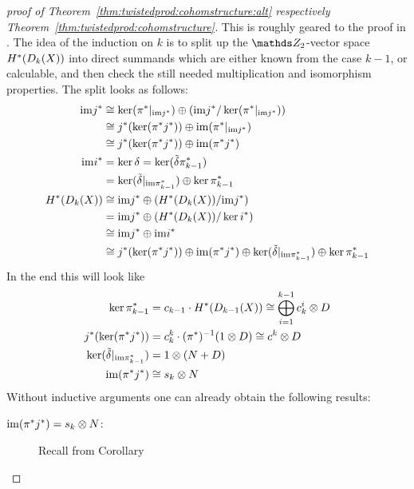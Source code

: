 \begin{proof}[proof of
  Theorem~\ref{thm:twistedprod:cohomstructure:alt}
  respectively Theorem~\ref{thm:twistedprod:cohomstructure}]
  This is roughly geared to the proof in \cite[Theorem~7.1]{brown}.
  The idea of the induction on $k$ is to split up the $\Zmod2$-vector
  space $H^*(D_{k}({X}))$ into direct summands which are either known
  from the case $k-1$, or calculable,
  and then check the still needed multiplication and isomorphism
  properties.
  The split looks as follows:
  \begin{align*}
    \mathrm{im}{j}^*
    &\cong \ker({\pi}^*|_{\mathrm{im}{j}^*})
      \oplus \left(\mathrm{im}{j}^*/\ker({\pi}^*|_{\mathrm{im}{j}^*})\right) \\
    &\cong {j}^*(\ker({\pi}^*{j}^*))
      \oplus \mathrm{im}({\pi}^*|_{\mathrm{im}{j}^*}) \\
    &\cong {j}^*(\ker({\pi}^*{j}^*))
      \oplus \mathrm{im}({\pi}^*{j}^*) \\
    \mathrm{im}{i}^*
    &= \ker\delta = \ker(\tilde\delta{\pi}^*_{k-1})\\
    &= \ker(\tilde\delta|_{\mathrm{im}{\pi}^*_{k-1}})
      \oplus \ker{\pi}^*_{k-1} \\
    H^*(D_{k}({X}))
    &\cong \mathrm{im}{j}^*
      \oplus \left( H^*(D_{k}({X}))/\mathrm{im}{j}^* \right)\\
    &= \mathrm{im}{j}^*
      \oplus \left( H^*(D_{k}({X}))/\ker{i}^* \right)\\
    &\cong \mathrm{im}{j}^* \oplus \mathrm{im}{i}^*\\
    &\cong {j}^*(\ker({\pi}^*{j}^*))
      \oplus \mathrm{im}({\pi}^*{j}^*)
      \oplus \ker(\tilde\delta|_{\mathrm{im}{\pi}^*_{k-1}})
      \oplus \ker{\pi}^*_{k-1}
  \end{align*}
  In the end this will look like
  \begin{align*}
    \ker{\pi}^*_{k-1} &= c_{k-1}\cdot H^*(D_{k-1}({X}))
                       \cong \bigoplus_{i=1}^{k-1} c_k^i\otimes D \\
    {j}^*(\ker({\pi}^*{j}^*))
    &= c_k^k\cdot({\pi}^*)^{-1}(1\otimes D)\cong c^k\otimes D \\
    \ker(\tilde\delta|_{\mathrm{im}{\pi}^*_{k-1}}) &= 1\otimes(N+D) \\
    \mathrm{im}({\pi}^*{j}^*) &\cong s_k\otimes N
  \end{align*}
  Without inductive arguments one can already obtain the following results:
  \begin{description}
  \item[$\mathrm{im}({\pi}^*{j}^*)=s_k\otimes N$:]
    Recall from
    Corollary~

\end{description}
\end{proof}
